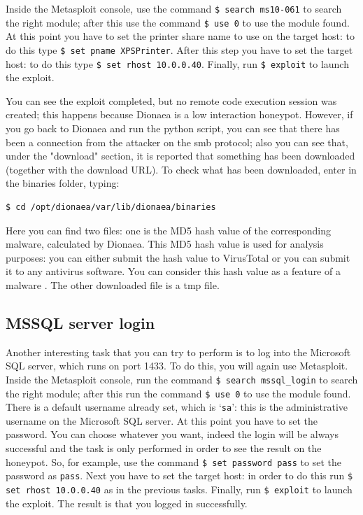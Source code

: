 \documentclass[epsfig,a4paper,11pt,titlepage,oneside,openany]{book}
\begin{document}
Inside the Metasploit console, use the command \texttt{\$ search ms10-061} to search the right module; after this use the command \texttt{\$ use 0} to use the module found. At this point you have to set the printer share name to use on the target host: to do this type \texttt{\$ set pname XPSPrinter}. After this step you have to set the target host: to do this type \texttt{\$ set rhost 10.0.0.40}. Finally, run \texttt{\$ exploit} to launch the exploit.

You can see the exploit completed, but no remote code execution session was created; this happens because Dionaea is a low interaction honeypot. However, if you go back to Dionaea and run the python script, you can see that there has been a connection from the attacker on the smb protocol; also you can see that, under the "download" section, it is reported that something has been downloaded (together with the download URL). To check what has been downloaded, enter in the binaries folder, typing:
\begin{lstlisting}[language=bash]
$ cd /opt/dionaea/var/lib/dionaea/binaries
\end{lstlisting}

\noindent Here you can find two files: one is the MD5 hash value of the corresponding malware, calculated by Dionaea. This MD5 hash value is used for analysis purposes: you can either submit the hash value to VirusTotal or you can submit it to any antivirus software. You can consider this hash value as a feature of a malware \cite{malware_capturing}. The other downloaded file is a tmp file.


\subsection{MSSQL server login}

Another interesting task that you can try to perform is to log into the Microsoft SQL server, which runs on port 1433. To do this, you will again use Metasploit. Inside the Metasploit console, run the command \texttt{\$ search mssql\_login} to search the right module; after this run the command \texttt{\$ use 0} to use the module found. There is a default username already set, which is ‘\texttt{sa}’: this is the administrative username on the Microsoft SQL server. At this point you have to set the password. You can choose whatever you want, indeed the login will be always successful and the task is only performed in order to see the result on the honeypot. So, for example, use the command \texttt{\$ set password pass} to set the password as \texttt{pass}. Next you have to set the target host: in order to do this run \texttt{\$ set rhost 10.0.0.40} as in the previous tasks. Finally, run \texttt{\$ exploit} to launch the exploit. The result is that you logged in successfully.
\end{document}
